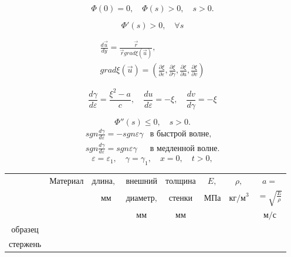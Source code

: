\documentclass[specialist, subf, href, colorlinks=true, 14pt, final]{disser}
\theoremstyle{definition}
\begin{document}
\addtocounter{equation}{1}
	\begin{equation}\label{eq:2313}
	 \Phi(0) = 0,\quad \Phi(s) > 0,\quad s > 0 .
	\tag{13}
	\end{equation} 

\addtocounter{equation}{1}
	\begin{equation}\label{eq:2313'}
	 \Phi'(s) > 0,\quad \forall s
	\tag{13'}
	\end{equation} 

\[
	\begin{array}{l}
	\displaystyle \frac{d\overrightarrow{u} }{dy} = \displaystyle \frac{\overrightarrow{r}}{\overrightarrow{r} grad \xi(\overrightarrow{u})},\\
	grad \xi(\overrightarrow{u}) = \left( \displaystyle \frac{\partial \xi}{\partial \varepsilon} , \frac{\partial \xi}{\partial \gamma} , \frac{\partial \xi}{\partial u} , \frac{\partial \xi}{\partial v} \right)
	\end{array}
\]

\addtocounter{equation}{1}
	\begin{equation}\label{eq:2314}
	 \frac{d\gamma}{d\varepsilon} = \frac{\xi^2 - a}{c}, \quad \frac{d u}{d \varepsilon} = - \xi, \quad \frac{d v}{d \gamma} = - \xi
	\tag{14}
	\end{equation} 

\addtocounter{equation}{1}
	\begin{equation}\label{eq:2315}
	 \Phi''(s) \leqslant  0 , \quad s > 0.
	\tag{15}
	\end{equation} 
\[
	\begin{array}{lr}
		sgn \displaystyle \frac{d \gamma}{d \varepsilon} = - sgn \varepsilon \gamma & \text{в быстрой волне}, \\
		sgn \displaystyle \frac{d \gamma}{d \varepsilon} = sgn \varepsilon \gamma & \text{в медленной волне}.
	\end{array}
\]
\[ \varepsilon = \varepsilon_1, \quad \gamma = \gamma_1, \quad x = 0, \quad t > 0, \]

\begin{center}
		\begin{tabular}{|c|c|c|c|c|c|c|c|}
			 \hline
			 & $\text{Материал}$ & $\text{длина, }$ & $\text{внешний}$ & $\text{толщина}$ & $E,$ & $\rho,$ & $a = $\\

			 &  & $\text{ мм}$ & $\text{диаметр,}$ & $\text{стенки}$ & $\text{МПа}$ & $\text{кг/м}^3$ & $ = \sqrt{\frac{E}{\rho}}$\\

			 & &  & $\text{мм}$ & $\text{мм}$ &  &  & $\text{м/с}$\\
			 \hline
			 $\text{образец}$&&&&&&&\\ \hline
			$\text{стержень}$&&&&&&&\\ \hline
			
		\end{tabular} 
	\end{center}
\end{document}
